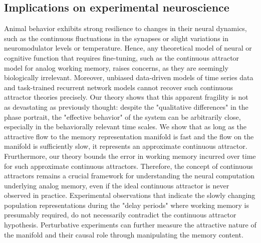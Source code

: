 \documentclass{article} %
\newcommand{\mpcomment}[1]{\textcolor{mpcolor}{(#1)}}
\newcounter{ct}
\theoremstyle{definition}
\theoremstyle{remark}
\begin{document}

\subsection{Implications on experimental neuroscience}\label{sec:implications}
Animal behavior exhibits strong resilience to changes in their neural dynamics, such as the continuous fluctuations in the synapses or slight variations in neuromodulator levels or temperature. 
Hence, any theoretical model of neural or cognitive function that requires fine-tuning, such as the continuous attractor model for analog working memory, raises concerns, as they are seemingly biologically irrelevant. 
Moreover, unbiased data-driven models of time series data and task-trained recurrent network models cannot recover such continuous attractor theories precisely. 
Our theory shows that this apparent fragility is not as devastating as previously thought: despite the "qualitative differences" in the phase portrait, the "effective behavior" of the system can be arbitrarily close, especially in the behaviorally relevant time scales. 
We show that as long as the attractive flow to the memory representation manifold is fast and the flow on the manifold is sufficiently slow, it represents an approximate continuous attractor. 
Frurthermore, our theory bounds the error in working memory incurred over time for such approximate continuous attractors. 
Therefore, the concept of continuous attractors remains a crucial framework for understanding the neural computation underlying analog memory, even if the ideal continuous attractor is never observed in practice. 
Experimental observations that indicate the slowly changing population representations during the "delay periods" where working memory is presumably required, do not necessarily contradict the continuous attractor hypothesis. Perturbative experiments can further measure the attractive nature of the manifold and their causal role through manipulating the memory content.
\end{document}
